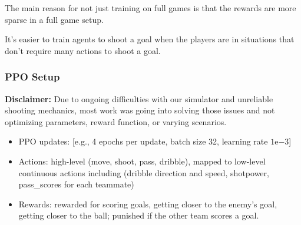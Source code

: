 The main reason for not just training on full games is that the rewards are more sparse in a full game setup.

It's easier to train agents to shoot a goal when the players are in situations that don't require many actions to shoot a goal.

\subsubsection{PPO Setup}
\textbf{Disclaimer:} Due to ongoing difficulties with our simulator and unreliable shooting mechanics, most work was going into solving those issues and not optimizing parameters, reward function, or varying scenarios.

\begin{itemize}
    \item PPO updates: [e.g., 4 epochs per update, batch size 32, learning rate $1\mathrm{e}{-3}$]
    \item Actions: high-level (move, shoot, pass, dribble), mapped to low-level continuous actions including (dribble direction and speed, shotpower, pass\_scores for each teammate)
    \item Rewards: rewarded for scoring goals, getting closer to the enemy's goal, getting closer to the ball; punished if the other team scores a goal.
\end{itemize}


